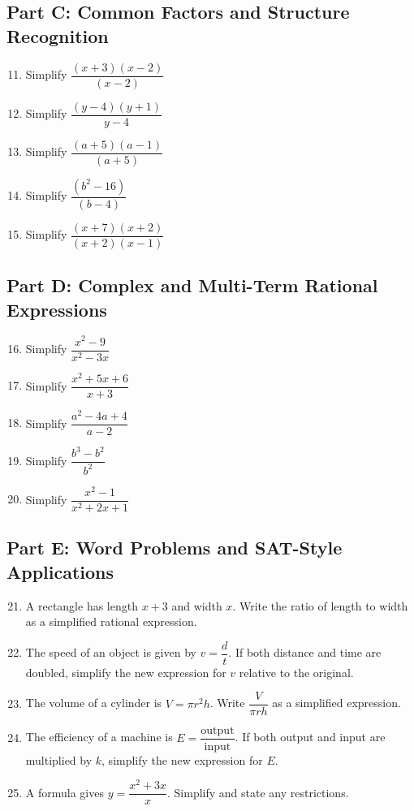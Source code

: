 \documentclass[14pt]{extarticle}
\begin{document}
\subsection*{Part C: Common Factors and Structure Recognition}
\begin{enumerate}
  \setcounter{enumi}{10}
  \item Simplify \(\dfrac{(x + 3)(x - 2)}{(x - 2)}\)
  \item Simplify \(\dfrac{(y - 4)(y + 1)}{y - 4}\)
  \item Simplify \(\dfrac{(a + 5)(a - 1)}{(a + 5)}\)
  \item Simplify \(\dfrac{(b^2 - 16)}{(b - 4)}\)
  \item Simplify \(\dfrac{(x + 7)(x + 2)}{(x + 2)(x - 1)}\)
\end{enumerate}

\subsection*{Part D: Complex and Multi-Term Rational Expressions}
\begin{enumerate}
  \setcounter{enumi}{15}
  \item Simplify \(\dfrac{x^2 - 9}{x^2 - 3x}\)
  \item Simplify \(\dfrac{x^2 + 5x + 6}{x + 3}\)
  \item Simplify \(\dfrac{a^2 - 4a + 4}{a - 2}\)
  \item Simplify \(\dfrac{b^3 - b^2}{b^2}\)
  \item Simplify \(\dfrac{x^2 - 1}{x^2 + 2x + 1}\)
\end{enumerate}

\subsection*{Part E: Word Problems and SAT-Style Applications}
\begin{enumerate}
  \setcounter{enumi}{20}
  \item A rectangle has length \(x + 3\) and width \(x\). Write the ratio of length to width as a simplified rational expression.
  \item The speed of an object is given by \(v = \dfrac{d}{t}\). If both distance and time are doubled, simplify the new expression for \(v\) relative to the original.
  \item The volume of a cylinder is \(V = \pi r^2h\). Write \(\dfrac{V}{\pi r h}\) as a simplified expression.
  \item The efficiency of a machine is \(E = \dfrac{\text{output}}{\text{input}}\). If both output and input are multiplied by \(k\), simplify the new expression for \(E\).
  \item A formula gives \(y = \dfrac{x^2 + 3x}{x}\). Simplify and state any restrictions.
\end{enumerate}
\end{document}

